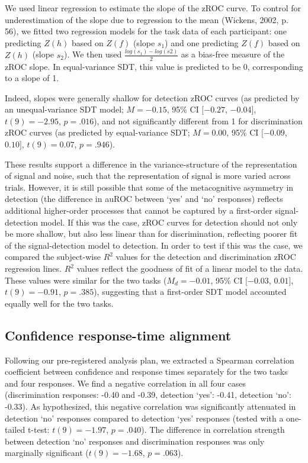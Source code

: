 \documentclass[12pt,twoside]{reedthesis}
\begin{document}
We used linear regression to estimate the slope of the zROC curve. To control for underestimation of the slope due to regression to the mean (Wickens, 2002, p. 56), we fitted two regression models for the task data of each participant: one predicting \(Z(h)\) based on \(Z(f)\) (slope \(s_1\)) and one predicting \(Z(f)\) based on \(Z(h)\) (slope \(s_2\)). We then used \(\frac{log(s_1)-log(s2)}{2}\) as a bias-free measure of the zROC slope. In equal-variance SDT, this value is predicted to be 0, corresponding to a slope of 1.

Indeed, slopes were generally shallow for detection zROC curves (as predicted by an unequal-variance SDT model; \(M = -0.15\), 95\% CI \([-0.27\), \(-0.04]\), \(t(9) = -2.95\), \(p = .016\)), and not significantly different from 1 for discrimination zROC curves (as predicted by equal-variance SDT; \(M = 0.00\), 95\% CI \([-0.09\), \(0.10]\), \(t(9) = 0.07\), \(p = .946\)).

These results support a difference in the variance-structure of the representation of signal and noise, such that the representation of signal is more varied across trials. However, it is still possible that some of the metacognitive asymmetry in detection (the difference in auROC between `yes' and `no' responses) reflects additional higher-order processes that cannot be captured by a first-order signal-detection model. If this was the case, zROC curves for detection should not only be more shallow, but also less linear than for discrimination, reflecting poorer fit of the signal-detection model to detection. In order to test if this was the case, we compared the subject-wise \(R^2\) values for the detection and discrimination zROC regression lines. \(R^2\) values reflect the goodness of fit of a linear model to the data. These values were similar for the two tasks (\(M_d = -0.01\), 95\% CI \([-0.03\), \(0.01]\), \(t(9) = -0.91\), \(p = .385\)), suggesting that a first-order SDT model accounted equally well for the two tasks.

\hypertarget{confidence-response-time-alignment}{%
\subsection{Confidence response-time alignment}\label{confidence-response-time-alignment}}

Following our pre-registered analysis plan, we extracted a Spearman correlation coefficient between confidence and response times separately for the two tasks and four responses. We find a negative correlation in all four cases (discrimination responses: -0.40 and -0.39, detection `yes': -0.41, detection `no': -0.33). As hypothesized, this negative correlation was significantly attenuated in detection `no' responses compared to detection `yes' responses (tested with a one-tailed t-test: \(t(9) = -1.97\), \(p = .040\)). The difference in correlation strength between detection `no' responses and discrimination responses was only marginally significant (\(t(9) = -1.68\), \(p = .063\)).
\end{document}
